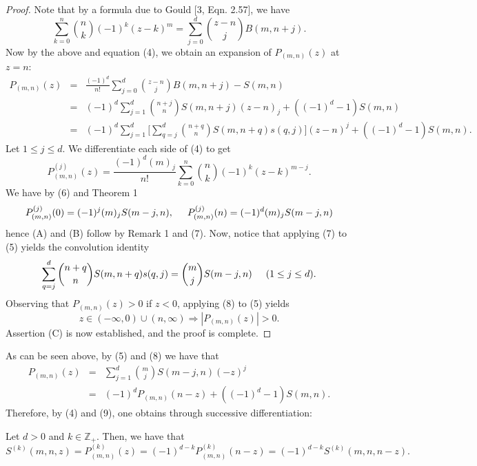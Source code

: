 \documentclass[]{amsart}
\begin{document}
\begin{proof}
Note that by a formula due to Gould [3, Eqn. 2.57], we have
\[ \sum_{k=0}^{n}{n \choose k}(-1)^{k}(z-k)^{m} = \sum_{j=0}^{d}{z-n \choose j}B(m,n+j). \]
Now by the above and equation (4), we obtain an expansion of $P_{(m,n)}(z)$ at $z = n$:
\begin{eqnarray}
P_{(m,n)}(z) & = & \frac{(-1)^{d}}{n!}\sum_{j=0}^{d}{z-n \choose j}B(m,n+j) - S(m,n) \nonumber \\ \nonumber
			 & = & (-1)^{d}\sum_{j=1}^{d}{n+j \choose n}S(m,n+j)(z-n)_{j} + ((-1)^{d}-1)S(m,n) \nonumber \\
			 & = & (-1)^{d}\sum_{j=1}^{d}\bigg[\sum_{q=j}^{d}{n + q \choose n}S(m,n+q)s(q,j) \bigg](z-n)^{j} + ((-1)^{d}-1)S(m,n).
\end{eqnarray}
Let $1 \leq j \leq d$.  We differentiate each side of (4) to get
\begin{equation}
P^{(j)}_{(m,n)}(z) = \frac{(-1)^{d}(m)_{j}}{n!}\sum_{k=0}^{n}{n \choose k}(-1)^{k}(z-k)^{m-j}.
\end{equation}
We have by (6) and Theorem 1
\begin{eqnarray}
P^{(j)}_{(m,n)}(0) = (-1)^{j}(m)_{j}S(m-j,n), \hspace{5mm} P^{(j)}_{(m,n)}(n) = (-1)^{d}(m)_{j}S(m-j,n)
\end{eqnarray}
hence (A) and (B) follow by Remark 1 and (7).  Now, notice that applying (7) to (5) yields the convolution identity
\begin{equation}
\sum_{q=j}^{d}{n + q \choose n}S(m,n+q)s(q,j) = {m \choose j}S(m-j,n) \hspace{5mm} (1 \leq j \leq d).
\end{equation}
Observing that $P_{(m,n)}(z) > 0$ if $z < 0$, applying (8) to (5) yields 
\[   z \in (-\infty,0) \cup (n,\infty) \Rightarrow |P_{(m,n)}(z)| > 0. \]  
Assertion (C) is now established, and the proof is complete.
\end{proof}
As can be seen above, by (5) and (8) we have that
\begin{eqnarray}
 P_{(m,n)}(z) & = & \sum_{j=1}^{d}{m \choose j}S(m-j,n)(-z)^{j} \nonumber \\ 
		      & = & (-1)^{d}P_{(m,n)}(n-z) + ((-1)^{d}-1)S(m,n).
\end{eqnarray}
Therefore, by (4) and (9), one obtains through successive differentiation:
\begin{prop}
Let $d > 0$ and $k \in \mathbb{Z}_{+}$.  Then, we have that
\[  S^{(k)}(m,n,z) = P^{(k)}_{(m,n)}(z) = (-1)^{d-k}P^{(k)}_{(m,n)}(n-z) = (-1)^{d-k}S^{(k)}(m,n,n-z). \]
\end{prop}
\end{document}

